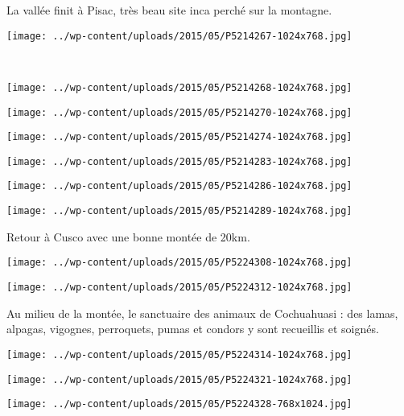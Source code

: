La vallée finit à Pisac, très beau site inca perché sur la montagne. 
\begin{center} \texttt{[image: ../wp-content/uploads/2015/05/P5214267-1024x768.jpg]} \end{center}
~\\
\begin{center} \texttt{[image: ../wp-content/uploads/2015/05/P5214268-1024x768.jpg]} \end{center}
\begin{center} \texttt{[image: ../wp-content/uploads/2015/05/P5214270-1024x768.jpg]} \end{center}
\begin{center} \texttt{[image: ../wp-content/uploads/2015/05/P5214274-1024x768.jpg]} \end{center}
\begin{center} \texttt{[image: ../wp-content/uploads/2015/05/P5214283-1024x768.jpg]} \end{center}
\begin{center} \texttt{[image: ../wp-content/uploads/2015/05/P5214286-1024x768.jpg]} \end{center}
\begin{center} \texttt{[image: ../wp-content/uploads/2015/05/P5214289-1024x768.jpg]} \end{center}

Retour à Cusco avec une bonne montée de 20km. 
\begin{center} \texttt{[image: ../wp-content/uploads/2015/05/P5224308-1024x768.jpg]} \end{center}
\begin{center} \texttt{[image: ../wp-content/uploads/2015/05/P5224312-1024x768.jpg]} \end{center}

Au milieu de la montée, le sanctuaire des animaux de Cochuahuasi : des lamas, alpagas, vigognes, perroquets, pumas et condors y sont recueillis et soignés. 
\begin{center} \texttt{[image: ../wp-content/uploads/2015/05/P5224314-1024x768.jpg]} \end{center}
\begin{center} \texttt{[image: ../wp-content/uploads/2015/05/P5224321-1024x768.jpg]} \end{center}
\vfill
\begin{center} \texttt{[image: ../wp-content/uploads/2015/05/P5224328-768x1024.jpg]} \end{center}
\vspace{-\topsep}
\vspace{-0.75mm}